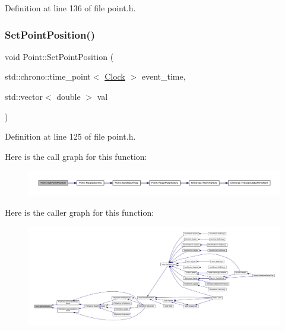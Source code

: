 Definition at line 136 of file point.\+h.

\mbox{\label{class_point_a9191f97ece64b8385140d5f800a3a4ca}} 
\subsubsection{\texorpdfstring{Set\+Point\+Position()}{SetPointPosition()}}
{\footnotesize\ttfamily void Point\+::\+Set\+Point\+Position (\begin{DoxyParamCaption}\item[{std\+::chrono\+::time\+\_\+point$<$ \hyperlink{universe_8h_a0ef8d951d1ca5ab3cfaf7ab4c7a6fd80}{Clock} $>$}]{event\+\_\+time,  }\item[{std\+::vector$<$ double $>$}]{val }\end{DoxyParamCaption})\hspace{0.3cm}{\ttfamily [inline]}}



Definition at line 125 of file point.\+h.

Here is the call graph for this function\+:
\nopagebreak
\begin{figure}[H]
\begin{center}
\leavevmode
\includegraphics[width=350pt]{class_point_a9191f97ece64b8385140d5f800a3a4ca_cgraph}
\end{center}
\end{figure}
Here is the caller graph for this function\+:
\nopagebreak
\begin{figure}[H]
\begin{center}
\leavevmode
\includegraphics[width=350pt]{class_point_a9191f97ece64b8385140d5f800a3a4ca_icgraph}
\end{center}
\end{figure}
\mbox{\label{class_point_adb2897b1a7bde15e81b72cb59342f186}} 
